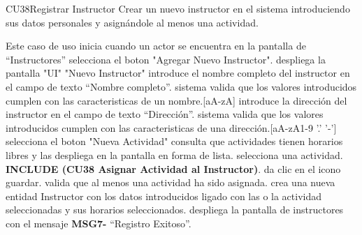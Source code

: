 \begin{UseCase}{CU38}{Registrar Instructor}{
		Crear un nuevo instructor en el sistema introduciendo sus datos personales y asignándole al menos una actividad.
	}
\end{UseCase}
\begin{UCtrayectoria}{Este caso de uso inicia cuando un actor se encuentra en la pantalla de “Instructores”}
	\UCpaso[\UCactor] selecciona el boton "Agregar Nuevo Instructor".
	\UCpaso despliega la pantalla "UI" "Nuevo Instructor"
	\UCpaso[\UCactor]introduce el nombre completo del instructor en el campo de texto “Nombre completo”.
	\UCpaso sistema valida que los valores introducidos cumplen con las caracteristicas de un nombre.[aA-zA]
	\UCpaso[\UCactor]introduce la dirección del instructor en el campo de texto “Dirección”.
	\UCpaso sistema valida que los valores introducidos cumplen con las caracteristicas de una dirección.[aA-zA1-9 '.' '-']
	\UCpaso selecciona el boton "Nueva Actividad"
	\UCpaso consulta que actividades tienen horarios libres y las despliega en la pantalla en forma de lista.
	\UCpaso[\UCactor] selecciona una actividad.
	\UCpaso \textbf{INCLUDE (CU38 Asignar Actividad al Instructor)}.
	\UCpaso[\UCactor] da clic en el icono guardar.
	\UCpaso valida que al menos una actividad ha sido asignada.
	\UCpaso crea una nueva entidad Instructor con los datos introducidos ligado con las o la actividad seleccionadas y sus horarios seleccionados.
	\UCpaso despliega la pantalla de instructores con el mensaje {\bf MSG7-} “Registro Exitoso”.
\end{UCtrayectoria}
